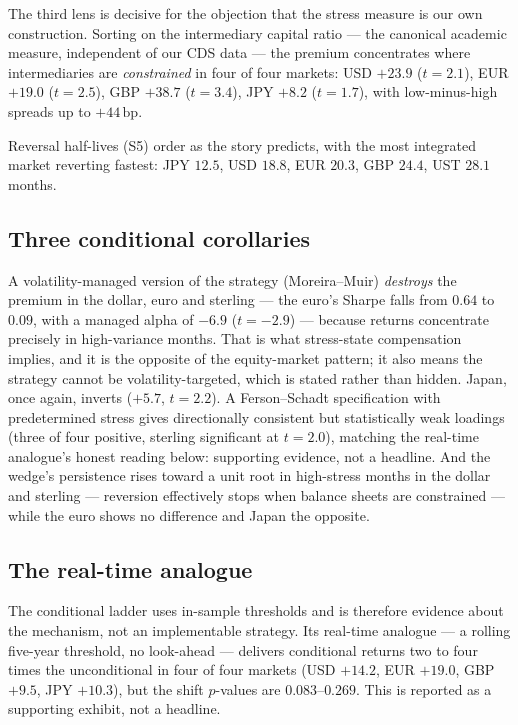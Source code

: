 \documentclass[11pt]{article}
\newcommand{\bp}{\,\mathrm{bp}}
\begin{document}
The third lens is decisive for the objection that the stress measure is our own construction. Sorting
on the \citet{hkm2017} intermediary capital ratio --- the canonical academic measure, independent of
our CDS data --- the premium concentrates where intermediaries are \emph{constrained} in four of four
markets: USD $+23.9$ ($t=2.1$), EUR $+19.0$ ($t=2.5$), GBP $+38.7$ ($t=3.4$), JPY $+8.2$ ($t=1.7$),
with low-minus-high spreads up to $+44\bp$.

Reversal half-lives (S5) order as the story predicts, with the most integrated market reverting
fastest: JPY $12.5$, USD $18.8$, EUR $20.3$, GBP $24.4$, UST $28.1$ months.

\subsection{Three conditional corollaries}\label{sec:corollaries}
A volatility-managed version of the strategy (Moreira--Muir) \emph{destroys} the premium in the
dollar, euro and sterling --- the euro's Sharpe falls from $0.64$ to $0.09$, with a managed alpha of
$-6.9$ ($t=-2.9$) --- because returns concentrate precisely in high-variance months. That is what
stress-state compensation implies, and it is the opposite of the equity-market pattern; it also
means the strategy cannot be volatility-targeted, which is stated rather than hidden. Japan, once
again, inverts ($+5.7$, $t=2.2$). A Ferson--Schadt specification with predetermined stress gives
directionally consistent but statistically weak loadings (three of four positive, sterling
significant at $t=2.0$), matching the real-time analogue's honest reading below: supporting
evidence, not a headline. And the wedge's persistence rises toward a unit root in high-stress months
in the dollar and sterling --- reversion effectively stops when balance sheets are constrained ---
while the euro shows no difference and Japan the opposite.

\subsection{The real-time analogue}\label{sec:conditional}
The conditional ladder uses in-sample thresholds and is therefore evidence about the mechanism, not an
implementable strategy. Its real-time analogue --- a rolling five-year threshold, no look-ahead ---
delivers conditional returns two to four times the unconditional in four of four markets (USD $+14.2$,
EUR $+19.0$, GBP $+9.5$, JPY $+10.3$), but the shift $p$-values are $0.083$--$0.269$. This is reported
as a supporting exhibit, not a headline.
\end{document}
